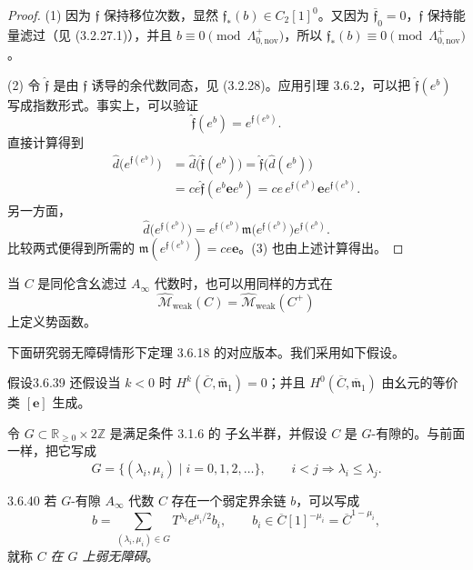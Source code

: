 \begin{proof}
(1) 因为 $\mathfrak f$ 保持移位次数，显然
$\mathfrak f_*(b)\in C_2[1]^0$。又因为
$\overline{\mathfrak f}_0=0$，$\mathfrak f$ 保持能量滤过（见
(3.2.27.1)），并且
$b\equiv0\pmod{\Lambda^+_{0,\mathrm{nov}}}$，所以
$\mathfrak f_*(b)\equiv0\pmod{\Lambda^+_{0,\mathrm{nov}}}$。

(2) 令 $\widehat{\mathfrak f}$ 是由 $\mathfrak f$ 诱导的余代数同态，见
(3.2.28)。应用引理 3.6.2，可以把
$\widehat{\mathfrak f}(e^b)$ 写成指数形式。事实上，可以验证
\begin{equation}
  \widehat{\mathfrak f}(e^b)=e^{\mathfrak f(e^b)}.
  \tag{3.6.38}\label{eq:3-6-38}
\end{equation}
直接计算得到
\[
\begin{aligned}
\widehat d\bigl(e^{\mathfrak f(e^b)}\bigr)
&=\widehat d\bigl(\widehat{\mathfrak f}(e^b)\bigr)
 =\widehat{\mathfrak f}\bigl(\widehat d(e^b)\bigr)\\
&=ce\widehat{\mathfrak f}(e^b\mathbf e e^b)
 =ce\,e^{\mathfrak f(e^b)}\mathbf e e^{\mathfrak f(e^b)}.
\end{aligned}
\]
另一方面，
\[
  \widehat d\bigl(e^{\mathfrak f(e^b)}\bigr)
  =e^{\mathfrak f(e^b)}
   \mathfrak m\bigl(e^{\mathfrak f(e^b)}\bigr)
   e^{\mathfrak f(e^b)}.
\]
比较两式便得到所需的
$\mathfrak m(e^{\mathfrak f(e^b)})=ce\mathbf e$。(3) 也由上述计算得出。
\end{proof}

当 $C$ 是同伦含幺滤过 $A_\infty$ 代数时，也可以用同样的方式在
\[
  \widehat{\mathcal M}_{\mathrm{weak}}(C)
  =\widehat{\mathcal M}_{\mathrm{weak}}(C^+)
\]
上定义势函数。

下面研究弱无障碍情形下定理 3.6.18 的对应版本。我们采用如下假设。

\begin{statement}{假设}{3.6.39}\label{assump:3-6-39}
还假设当 $k<0$ 时
$H^k(\overline C,\overline{\mathfrak m}_1)=0$；并且
$H^0(\overline C,\overline{\mathfrak m}_1)$ 由幺元的等价类
$[\mathbf e]$ 生成。
\end{statement}

令 $G\subset\mathbb R_{\geq0}\times2\mathbb Z$ 是满足条件 3.1.6 的
子幺半群，并假设 $C$ 是 $G$-有隙的。与前面一样，把它写成
\[
  G=\{(\lambda_i,\mu_i)\mid i=0,1,2,\ldots\},
  \qquad i<j\Longrightarrow\lambda_i\leq\lambda_j.
\]

\begin{definition}{3.6.40}\label{def:3-6-40}
若 $G$-有隙 $A_\infty$ 代数 $C$ 存在一个弱定界余链 $b$，可以写成
\[
  b=\sum_{(\lambda_i,\mu_i)\in G}
    T^{\lambda_i}e^{\mu_i/2}b_i,
  \qquad
  b_i\in\overline C[1]^{-\mu_i}=\overline C^{1-\mu_i},
\]
就称 $C$ \emph{在 $G$ 上弱无障碍}。
\end{definition}

